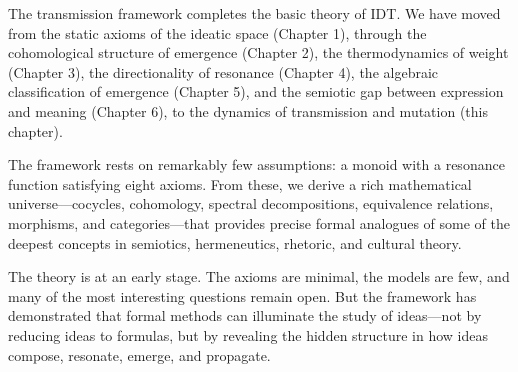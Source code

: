 The transmission framework completes the basic theory of IDT. We have
moved from the static axioms of the ideatic space (Chapter 1), through
the cohomological structure of emergence (Chapter 2), the thermodynamics
of weight (Chapter 3), the directionality of resonance (Chapter 4), the
algebraic classification of emergence (Chapter 5), and the semiotic gap
between expression and meaning (Chapter 6), to the dynamics of
transmission and mutation (this chapter).

The framework rests on remarkably few assumptions: a monoid with a
resonance function satisfying eight axioms. From these, we derive a
rich mathematical universe---cocycles, cohomology, spectral
decompositions, equivalence relations, morphisms, and categories---that
provides precise formal analogues of some of the deepest concepts in
semiotics, hermeneutics, rhetoric, and cultural theory.

The theory is at an early stage. The axioms are minimal, the models are
few, and many of the most interesting questions remain open. But the
framework has demonstrated that formal methods can illuminate the study
of ideas---not by reducing ideas to formulas, but by revealing the
hidden structure in how ideas compose, resonate, emerge, and propagate.

